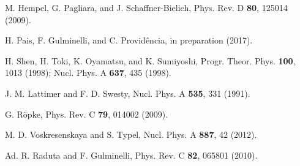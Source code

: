 \documentclass[aps,prc,nofootinbib,twocolumn,showpacs]{revtex4-1}
\begin{document}
\begin{thebibliography}{99}
 M. Hempel, G. Pagliara, and J. Schaffner-Bielich,
  Phys. Rev. D {\bf 80}, 125014 (2009).
  
 H. Pais, F. Gulminelli, and C. Provid\^encia, in preparation (2017).

 H. Shen, H. Toki, K. Oyamatsu, and K. Sumiyoshi,
  Progr. Theor. Phys. {\bf 100}, 1013 (1998); Nucl. Phys. A {\bf 637}, 435 (1998).
  
 J. M. Lattimer and F. D. Swesty, Nucl. Phys. A {\bf 535}, 331 (1991).  

 G. R\"opke, Phys. Rev. C {\bf 79}, 014002 (2009).   

 M. D. Voskresenskaya and S. Typel, Nucl. Phys. A {\bf 887}, 42 (2012).

 Ad. R. Raduta and F. Gulminelli, Phys. Rev. C {\bf 82}, 065801 (2010).



\end{thebibliography}
\end{document}
